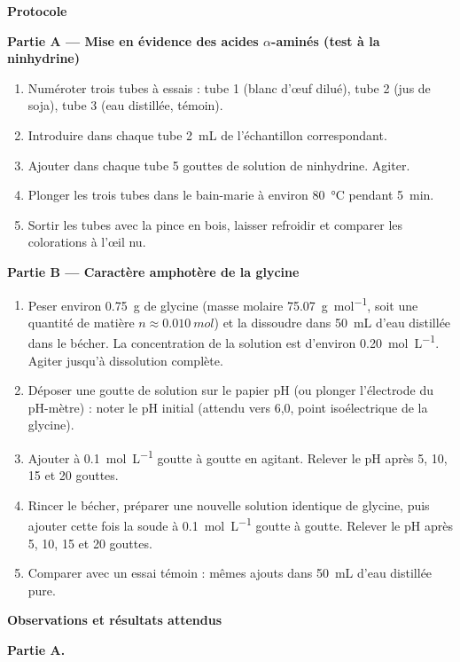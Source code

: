 \documentclass[11pt]{article}
\begin{document}
\textbf{Protocole}\par

\textbf{Partie A — Mise en évidence des acides $\alpha$-aminés (test à la ninhydrine)}

\begin{enumerate}
\item Numéroter trois tubes à essais : tube 1 (blanc d'œuf dilué), tube 2 (jus de soja), tube 3 (eau distillée, témoin).
\item Introduire dans chaque tube \SI{2}{mL} de l'échantillon correspondant.
\item Ajouter dans chaque tube 5 gouttes de solution de ninhydrine. Agiter.
\item Plonger les trois tubes dans le bain-marie à environ \SI{80}{\celsius} pendant \SI{5}{min}.
\item Sortir les tubes avec la pince en bois, laisser refroidir et comparer les colorations à l'œil nu.
\end{enumerate}

\textbf{Partie B — Caractère amphotère de la glycine}

\begin{enumerate}
\item Peser environ \SI{0,75}{g} de glycine (masse molaire \SI{75,07}{g.mol^{-1}}, soit une quantité de matière $n \approx \SI{0,010}{mol}$) et la dissoudre dans \SI{50}{mL} d'eau distillée dans le bécher. La concentration de la solution est d'environ \SI{0,20}{mol.L^{-1}}. Agiter jusqu'à dissolution complète.
\item Déposer une goutte de solution sur le papier pH (ou plonger l'électrode du pH-mètre) : noter le pH initial (attendu vers 6,0, point isoélectrique de la glycine).
\item Ajouter  à \SI{0,1}{mol.L^{-1}} goutte à goutte en agitant. Relever le pH après 5, 10, 15 et 20 gouttes.
\item Rincer le bécher, préparer une nouvelle solution identique de glycine, puis ajouter cette fois la soude à \SI{0,1}{mol.L^{-1}} goutte à goutte. Relever le pH après 5, 10, 15 et 20 gouttes.
\item Comparer avec un essai témoin : mêmes ajouts dans \SI{50}{mL} d'eau distillée pure.
\end{enumerate}

\textbf{Observations et résultats attendus}\par

\textbf{Partie A.}
\end{document}
